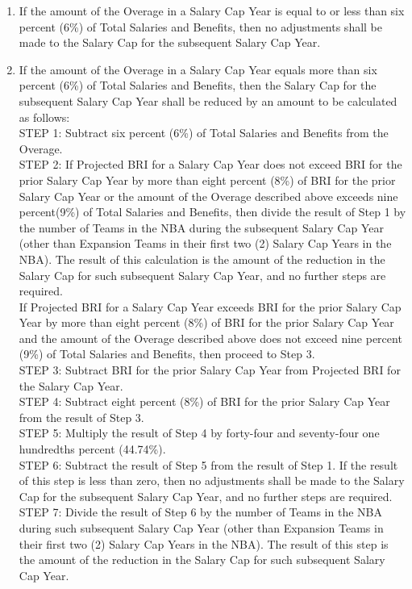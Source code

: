 \documentclass[
]{book}
\providecommand{\tightlist}{%
  \setlength{\itemsep}{0pt}\setlength{\parskip}{0pt}}
\begin{document}
\begin{enumerate}
\begin{enumerate}
    \begin{enumerate}
    \def\labelenumiii{(\roman{enumiii})}
    \tightlist
    \item
      If the amount of the Overage in a Salary Cap Year is equal to or less than six percent (6\%) of Total Salaries and Benefits, then no adjustments shall be made to the Salary Cap for the subsequent Salary Cap Year.
    \item
      If the amount of the Overage in a Salary Cap Year equals more than six percent (6\%) of Total Salaries and Benefits, then the Salary Cap for the subsequent Salary Cap Year shall be reduced by an amount to be calculated as follows:\\
      STEP 1: Subtract six percent (6\%) of Total Salaries and Benefits from the Overage.\\
      STEP 2: If Projected BRI for a Salary Cap Year does not exceed BRI for the prior Salary Cap Year by more than eight percent (8\%) of BRI for the prior Salary Cap Year or the amount of the Overage described above exceeds nine percent(9\%) of Total Salaries and Benefits, then divide the result of Step 1 by the number of Teams in the NBA during the subsequent Salary Cap Year (other than Expansion Teams in their first two (2) Salary Cap Years in the NBA). The result of this calculation is the amount of the reduction in the Salary Cap for such subsequent Salary Cap Year, and no further steps are required.\\
      If Projected BRI for a Salary Cap Year exceeds BRI for the prior Salary Cap Year by more than eight percent (8\%) of BRI for the prior Salary Cap Year and the amount of the Overage described above does not exceed nine percent (9\%) of Total Salaries and Benefits, then proceed to Step 3.\\
      STEP 3: Subtract BRI for the prior Salary Cap Year from Projected BRI for the Salary Cap Year.\\
      STEP 4: Subtract eight percent (8\%) of BRI for the prior Salary Cap Year from the result of Step 3.\\
      STEP 5: Multiply the result of Step 4 by forty-four and seventy-four one hundredths percent (44.74\%).\\
      STEP 6: Subtract the result of Step 5 from the result of Step 1. If the result of this step is less than zero, then no adjustments shall be made to the Salary Cap for the subsequent Salary Cap Year, and no further steps are required.\\
      STEP 7: Divide the result of Step 6 by the number of Teams in the NBA during such subsequent Salary Cap Year (other than Expansion Teams in their first two (2) Salary Cap Years in the NBA). The result of this step is the amount of the reduction in the Salary Cap for such subsequent Salary Cap Year.\\

\end{enumerate}
\end{enumerate}
\end{enumerate}
\end{document}
